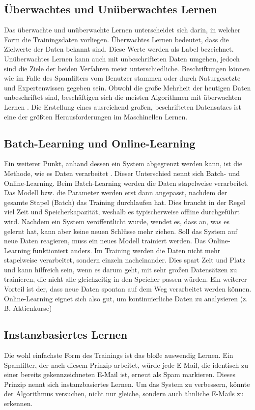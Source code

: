 \subsection{Überwachtes und Unüberwachtes Lernen}
Das überwachte und unüberwachte Lernen unterscheidet
sich darin, in welcher Form die Trainingsdaten vorliegen.
Überwachtes Lernen bedeutet, dass die Zielwerte der Daten bekannt
sind. Diese Werte werden als Label bezeichnet. Unüberwachtes Lernen
kann auch mit unbeschrifteten Daten umgehen, jedoch sind die Ziele
der beiden Verfahren meist unterschiedliche.
Beschriftungen können wie im Falle des
Spamfilters vom Benutzer stammen oder durch Naturgesetzte und Expertenwissen
gegeben sein. Obwohl die große Mehrheit der heutigen Daten unbeschriftet sind,
beschäftigen sich die meisten Algorithmen mit überwachten Lernen
\parencite[235]{book:hands-on-ml}.
Die Erstellung eines ausreichend großen, beschrifteten Datensatzes
ist eine der größten Herausforderungen im Maschinellen Lernen.

\subsection{Batch-Learning und Online-Learning}
Ein weiterer Punkt, anhand dessen ein System abgegrenzt
werden kann, ist die Methode, wie es Daten verarbeitet \parencite[15]{book:hands-on-ml}.
Dieser Unterschied nennt sich Batch- und Online-Learning.
Beim Batch-Learning werden die Daten stapelweise verarbeitet.
Das Modell bzw. die Parameter werden erst dann angepasst,
nachdem der gesamte Stapel (Batch) das Training durchlaufen hat.
Dies braucht in der Regel viel Zeit und Speicherkapazität, weshalb
es typischerweise offline durchgeführt wird.
Nachdem ein System veröffentlicht wurde, wendet es, dass an, was es gelernt hat,
kann aber keine neuen Schlüsse mehr ziehen.
Soll das System auf neue Daten reagieren, muss ein neues Modell trainiert werden.
Das Online-Learning funktioniert anders.
Im Training werden die Daten nicht mehr stapelweise verarbeitet,
sondern einzeln nacheinander.
Dies spart Zeit und Platz und kann hilfreich sein, wenn es darum geht,
mit sehr großen Datensätzen zu trainieren, die nicht alle gleichzeitig
in den Speicher passen würden.
Ein weiterer Vorteil ist der, dass neue Daten spontan auf dem Weg
verarbeitet werden können. Online-Learning eignet sich also gut,
um kontinuierliche Daten zu analysieren (z.\,B. Aktienkurse)

\subsection{Instanzbasiertes Lernen}
Die wohl einfachste Form des Trainings ist das bloße auswendig Lernen.
Ein Spamfilter, der nach diesem Prinzip arbeitet, würde jede E-Mail,
die identisch zu einer bereits gekennzeichneten E-Mail ist, erneut als Spam markieren.
Dieses Prinzip nennt sich instanzbasiertes Lernen. Um das System zu
verbessern, könnte der Algorithmus versuchen, nicht nur gleiche,
sondern auch ähnliche E-Mails zu erkennen.

